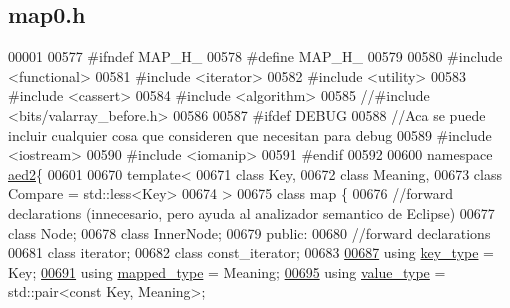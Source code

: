 \hypertarget{map0_8h_source}{}\subsection{map0.\+h}

\begin{DoxyCode}
00001 
00577 \textcolor{preprocessor}{#ifndef MAP\_H\_}
00578 \textcolor{preprocessor}{#define MAP\_H\_}
00579 
00580 \textcolor{preprocessor}{#include <functional>}
00581 \textcolor{preprocessor}{#include <iterator>}
00582 \textcolor{preprocessor}{#include <utility>}
00583 \textcolor{preprocessor}{#include <cassert>}
00584 \textcolor{preprocessor}{#include <algorithm>}
00585 \textcolor{comment}{//#include <bits/valarray\_before.h>}
00586 
00587 \textcolor{preprocessor}{#ifdef DEBUG}
00588 \textcolor{comment}{//Aca se puede incluir cualquier cosa que consideren que necesitan para debug}
00589 \textcolor{preprocessor}{#include <iostream>}
00590 \textcolor{preprocessor}{#include <iomanip>}
00591 \textcolor{preprocessor}{#endif}
00592 
00600 \textcolor{keyword}{namespace }\hyperlink{namespaceaed2}{aed2}\{
00601 
00670 \textcolor{keyword}{template}<
00671   \textcolor{keyword}{class }Key,
00672   \textcolor{keyword}{class }Meaning,
00673   \textcolor{keyword}{class }Compare = std::less<Key>
00674 >
00675 \textcolor{keyword}{class }map \{
00676     \textcolor{comment}{//forward declarations (innecesario, pero ayuda al analizador semantico de Eclipse)}
00677     \textcolor{keyword}{class }Node;
00678     \textcolor{keyword}{class }InnerNode;
00679 \textcolor{keyword}{public}:
00680     \textcolor{comment}{//forward declarations}
00681     \textcolor{keyword}{class }iterator;
00682     \textcolor{keyword}{class }const\_iterator;
00683 
\hypertarget{map0_8h_source.tex_l00687}{}\hyperlink{classaed2_1_1map_a4273e8812e7105a618df58a2c8b72b7d_a4273e8812e7105a618df58a2c8b72b7d}{00687}     \textcolor{keyword}{using} \hyperlink{classaed2_1_1map_a4273e8812e7105a618df58a2c8b72b7d_a4273e8812e7105a618df58a2c8b72b7d}{key\_type} = Key;
\hypertarget{map0_8h_source.tex_l00691}{}\hyperlink{classaed2_1_1map_aa3e34bf624f3009884a71b18f4ddae40_aa3e34bf624f3009884a71b18f4ddae40}{00691}     \textcolor{keyword}{using} \hyperlink{classaed2_1_1map_aa3e34bf624f3009884a71b18f4ddae40_aa3e34bf624f3009884a71b18f4ddae40}{mapped\_type} = Meaning;
\hypertarget{map0_8h_source.tex_l00695}{}\hyperlink{classaed2_1_1map_a719db98e0ff9a837610f76be33264680_a719db98e0ff9a837610f76be33264680}{00695}     \textcolor{keyword}{using} \hyperlink{classaed2_1_1map_a719db98e0ff9a837610f76be33264680_a719db98e0ff9a837610f76be33264680}{value\_type} = std::pair<const Key, Meaning>;

\end{DoxyCode}
